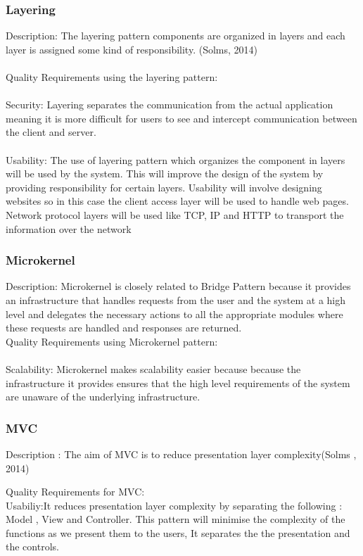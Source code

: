  \subsubsection{Layering}
 Description: The layering pattern components are organized in layers and each layer is assigned some kind of responsibility. (Solms, 2014)\\
 \\

 Quality Requirements using the layering pattern:\\
 \\
 Security: Layering separates the communication from the actual application meaning it is more difficult for users to see and intercept communication between the client and server.\\
  \\Usability: The use of layering pattern which organizes the component in layers will be used by the system. This will improve the design of the system by providing responsibility for certain layers. Usability will involve designing websites so in this case the client access layer will be used to handle web pages. Network protocol layers will be used like TCP, IP and HTTP to transport the information over the network\\
 
\subsubsection{Microkernel}
Description: Microkernel is closely related to Bridge Pattern because it provides an infrastructure that handles requests from the user and the system at a high level and delegates the necessary actions to all the appropriate modules where these requests are handled and responses are returned.
\\
Quality Requirements using Microkernel pattern:\\
\\
Scalability: Microkernel makes scalability easier because because the infrastructure it provides ensures that the high level requirements of the system are unaware of the underlying infrastructure.\\

\subsubsection{MVC}
 Description : The aim of MVC is to reduce presentation layer complexity(Solms , 2014)

Quality Requirements for MVC:\\

Usabiliy:It reduces presentation layer complexity by separating the following : Model , View and Controller. This pattern will minimise the complexity of the functions as we present them to the users, It separates the the presentation and the controls.

